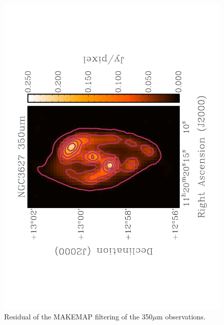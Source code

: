 \begin{figure}
  \centering
  \label{fig_350}
  \includegraphics[scale=0.5,angle=270]{obs_imgs/350_um.jpeg}
  \caption[NGC3627 350$\mu$m Observations]{Residual of the MAKEMAP filtering of the 350$\mu$m observations.}
\end{figure}


